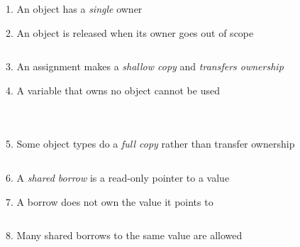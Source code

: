 \documentclass[9pt]{beamer}
\renewcommand\big[1]{
  \begin{center}
    \Large{#1}
  \end{center}
}
\begin{document}
\begin{frame}
  \big{1. An object has a \emph{single} owner}

  \big{2. An object is released when its owner goes out of scope}
\end{frame}

\begin{frame}[fragile]
  \inputminted{rust}{demos/00_dealloc.rs}
\end{frame}

\begin{frame}
  \big{3. An assignment makes a \emph{shallow copy} and \emph{transfers ownership}}

  \big{4. A variable that owns no object cannot be used}
\end{frame}

\begin{frame}[fragile]
  \inputminted{rust}{demos/01_move.rs}
\end{frame}

\begin{frame}[fragile]
  \inputminted{rust}{demos/03_func_move.rs}
\end{frame}

\begin{frame}[fragile]
  \inputminted{rust}{demos/04_retransfer.rs}
\end{frame}

\begin{frame}
  \big{5. Some object types do a \emph{full copy} rather than transfer ownership}
\end{frame}

\begin{frame}[fragile]
  \inputminted{rust}{demos/02_copy.rs}
\end{frame}

\begin{frame}
  \big{6. A \emph{shared borrow} is a read-only pointer to a value}

  \big{7. A borrow does not own the value it points to}
\end{frame}

\begin{frame}[fragile]
  \inputminted{rust}{demos/05_borrow.rs}
\end{frame}

\begin{frame}
  \big{8. Many shared borrows to the same value are allowed}
\end{frame}

\begin{frame}[fragile]
  \inputminted{rust}{demos/06_multiple_shared_borrows.rs}
\end{frame}
\end{document}

